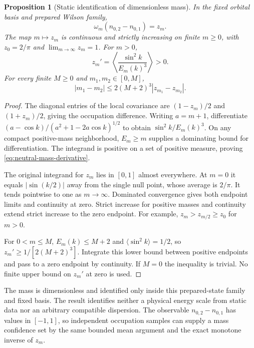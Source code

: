 \documentclass[11pt]{article}
\newtheorem{proposition}[theorem]{Proposition}
\theoremstyle{definition}
\begin{document}
\begin{proposition}[Static identification of dimensionless mass]
\label{prop:neutral-mass}
In the fixed orbital basis and prepared Wilson family,
\[
 \omega_m(n_{0,2}-n_{0,1})=z_m.
\]
The map $m\mapsto z_m$ is continuous and strictly increasing on finite
$m\ge0$, with $z_0=2/\pi$ and $\lim_{m\to\infty}z_m=1$.
For $m>0$,
\begin{equation}
 z_m'=\left\langle\frac{\sin^2k}{E_m(k)^3}\right\rangle>0.
 \label{eq:neutral-mass-derivative}
\end{equation}
For every finite $M\ge0$ and $m_1,m_2\in[0,M]$,
\begin{equation}
 |m_1-m_2|\le 2(M+2)^3|z_{m_1}-z_{m_2}|.
 \label{eq:neutral-mass-inverse}
\end{equation}
\end{proposition}
\begin{proof}
The diagonal entries of the local covariance are
$(1-z_m)/2$ and $(1+z_m)/2$, giving the occupation difference.
Writing $a=m+1$, differentiate
$(a-\cos k)/(a^2+1-2a\cos k)^{1/2}$ to obtain
$\sin^2 k/E_m(k)^3$. On any compact positive-mass neighborhood,
$E_m\ge m$ supplies a dominating bound for differentiation.
The integrand is positive on a set of positive measure, proving
\eqref{eq:neutral-mass-derivative}.

The original integrand for $z_m$ lies in $[0,1]$ almost everywhere.
At $m=0$ it equals $|\sin(k/2)|$ away from the single null point,
whose average is $2/\pi$. It tends pointwise to one as $m\to\infty$.
Dominated convergence gives both endpoint limits and continuity at zero.
Strict increase for positive masses and continuity extend strict increase
to the zero endpoint. For example,
$z_m>z_{m/2}\ge z_0$ for $m>0$.

For $0<m\le M$, $E_m(k)\le M+2$ and
$\langle\sin^2k\rangle=1/2$, so
$z_m'\ge1/[2(M+2)^3]$. Integrate this lower bound between positive
endpoints and pass to a zero endpoint by continuity. If $M=0$ the
inequality is trivial. No finite upper bound on $z_m'$ at zero is used.
\end{proof}

The mass is dimensionless and identified only inside this prepared-state
family and fixed basis. The result identifies neither a physical energy
scale from static data nor an arbitrary compatible dispersion.
The observable $n_{0,2}-n_{0,1}$ has values in $[-1,1]$, so independent
occupation samples can supply a mass confidence set by the same bounded
mean argument and the exact monotone inverse of $z_m$.
\end{document}
